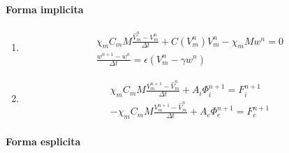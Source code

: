 \documentclass[a4paper]{article}
\theoremstyle{definition}
\begin{document}
\paragraph{Forma implicita}
\begin{enumerate}[label = \Roman*, align = Center]
\item 
   \begin{equation}
   \begin{gathered}
   \chi_m C_m M\frac{\hat{V}_m^n - V_m^n}{\Delta t} + C(V_m^n)V_m^n -\chi_mMw^n = 0
   \\
   \frac{w^{n+1}-w^n}{\Delta t} = \epsilon (V_m^n - \gamma w^n)
   \end{gathered}
   \end{equation}
\item 
   \begin{equation}
   \begin{gathered}
   \chi_m C_m M\frac{V_m^{n+1} - \hat{V}_m^n}{\Delta t} + A_i\Phi_i^{n+1} = F_i^{n+1} \\
   -\chi_m C_m M\frac{V_m^{n+1} - \hat{V}_m^n}{\Delta t} + A_e\Phi_e^{n+1} = F_e^{n+1}
   \end{gathered}
   \end{equation}
\end{enumerate}
\vspace{5mm}
\paragraph{Forma esplicita}
\end{document}
